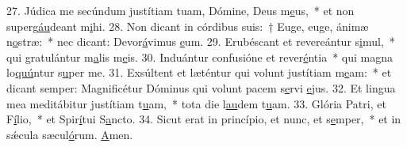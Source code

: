 27. Júdica me secúndum justítiam tuam, Dómine, Deus m\uline{e}us,~* et non superg\uline{áu}deant m\uline{i}hi.
28. Non dicant in córdibus suis:~† Euge, euge, ánimæ n\uline{o}stræ:~* nec dicant: Devor\uline{á}vimus \uline{e}um.
29. Erubéscant et revereántur s\uline{i}mul,~* qui gratulántur m\uline{a}lis m\uline{e}is.
30. Induántur confusióne et rever\uline{é}ntia~* qui magna lo\uline{quú}ntur s\uline{u}per me.
31. Exsúltent et læténtur qui volunt justítiam m\uline{e}am:~* et dicant semper: Magnificétur Dóminus qui volunt pacem s\uline{e}rvi \uline{e}jus.
32. Et lingua mea meditábitur justítiam t\uline{u}am,~* tota die l\uline{au}dem t\uline{u}am.
33. Glória Patri, et F\uline{í}lio,~* et Spir\uline{í}tui S\uline{a}ncto.
34. Sicut erat in princípio, et nunc, et s\uline{e}mper,~* et in sǽcula sæcul\uline{ó}rum. \uline{A}men.
